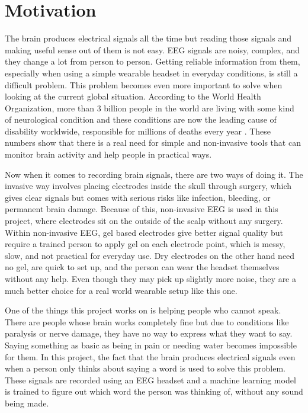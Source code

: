 \section{Motivation}
The brain produces electrical signals all the time but reading those signals and making useful sense out of them is not easy. EEG signals are noisy, complex, and they change a lot from person to person. Getting reliable information from them, especially when using a simple wearable headset in everyday conditions, is still a difficult problem. This problem becomes even more important to solve when looking at the current global situation. According to the World Health Organization, more than 3 billion people in the world are living with some kind of neurological condition and these conditions are now the leading cause of disability worldwide, responsible for millions of deaths every year \cite{who2024neuro}. These numbers show that there is a real need for simple and non-invasive tools that can monitor brain activity and help people in practical ways.

Now when it comes to recording brain signals, there are two ways of doing it. The invasive way involves placing electrodes inside the skull through surgery, which gives clear signals but comes with serious risks like infection, bleeding, or permanent brain damage. Because of this, non-invasive EEG is used in this project, where electrodes sit on the outside of the scalp without any surgery. Within non-invasive EEG, gel based electrodes give better signal quality but require a trained person to apply gel on each electrode point, which is messy, slow, and not practical for everyday use. Dry electrodes on the other hand need no gel, are quick to set up, and the person can wear the headset themselves without any help. Even though they may pick up slightly more noise, they are a much better choice for a real world wearable setup like this one.

One of the things this project works on is helping people who cannot speak. There are people whose brain works completely fine but due to conditions like paralysis or nerve damage, they have no way to express what they want to say. Saying something as basic as being in pain or needing water becomes impossible for them. In this project, the fact that the brain produces electrical signals even when a person only thinks about saying a word is used to solve this problem. These signals are recorded using an EEG headset and a machine learning model is trained to figure out which word the person was thinking of, without any sound being made.

